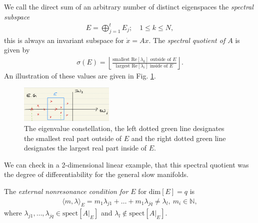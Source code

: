 We call the direct sum of an arbitrary number of distinct eigenspaces the \emph{spectral subspace} 
\begin{align}
E = \bigoplus_{j=1}^{t}E_{j};\quad 1 \leq k \leq N,	
\end{align}
this is always an invariant subspace for $\dot{x} = Ax$. The \emph{spectral quotient of $A$} is given by
\begin{align}
	\sigma(E) = \left\lfloor \frac{ \textrm{smallest Re} [\lambda _k] \textrm{ outside of }E}{ \textrm{largest Re} [\lambda _i]  \textrm{ inside of } E}\right\rfloor.
\end{align}
An illustration of these values are given in Fig. \ref{fig:spect_quotient}.
\begin{figure}[h!]
	\centering
	\includegraphics[width=0.4\textwidth]{figures/ch9/26spect_quot.png}
	\caption{The eigenvalue constellation, the left dotted green line designates the smallest real part outside of $E$ and the right dotted green line designates the largest real part inside of $E$.}
	\label{fig:spect_quotient}
\end{figure}

We can check in a 2-dimensional linear example, that this spectral quotient was the degree of differentiability for the general slow manifolds.

The \emph{external nonresonance condition for $E$} for $ \textrm{dim} [E]=q$ is
\begin{align}
	\langle m, \lambda \rangle_{E} = m_1 \lambda _{j1} + \ldots + m_1 \lambda _{jq} \neq \lambda_l,\ m_i \in \mathbb{N}	,
\end{align} 
where $\lambda _{j1},\ldots,\lambda _{jq}\in  \textrm{spect}[A|_{E}] $ and $\lambda _{l} \not \in  \textrm{spect} [A|_{E}]$.


